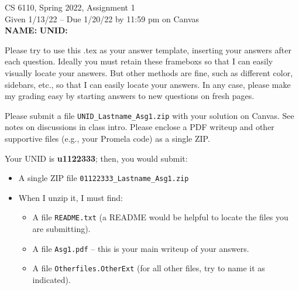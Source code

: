 \documentclass[11pt]{article}
\begin{document}



\begin{center}
\begin{large}
  CS 6110, Spring 2022, Assignment 1  \\
  Given 1/13/22 -- Due 1/20/22 by 11:59 pm on Canvas
  \ \\
      {  {\Large\bf NAME: } \hfill {\Large\bf UNID: }\hspace{4cm} }
\end{large}
\end{center}
\begin{large}
          Please try to
          use this .tex as your answer template,
          inserting your answers
          after each question.
          Ideally
          you must retain
          these frameboxs so that I can easily visually
          locate your answers.
          But other methods are fine, such
          as different
          color, sidebars, etc., so that I can
          easily locate your answers.
          In any case, please
          make my grading easy by 
          starting answers to new questions
          on fresh pages.
\end{large}

\date{}


 Please submit a file
\verb|UNID_Lastname_Asg1.zip| with your solution on Canvas.
%
See notes on discussions in class intro.
%
Please enclose a PDF writeup and other supportive files (e.g.,
your Promela code) as a single ZIP.

 Your UNID is {\bf u1122333}; then, you
would submit:
%
\begin{itemize}
\item A single ZIP file \verb|01122333_Lastname_Asg1.zip|
\item When I unzip it, I must find:
  \begin{itemize}
  \item A file \verb|README.txt| (a README would be helpful
    to locate the files you are submitting).
  \item A file \verb|Asg1.pdf| -- this is your main writeup
    of your answers.
  \item A file \verb|Otherfiles.OtherExt| (for all other files,
    try to name it as indicated).
  \end{itemize}
\end{itemize}
\end{document}
